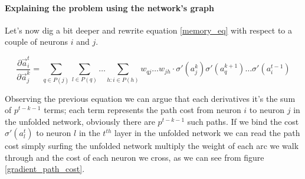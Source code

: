 \paragraph{Explaining the problem using the network's graph}
Let's now dig a bit deeper and rewrite equation \ref{memory_eq} with respect to a couple of neurons $i$ and $j$.

\begin{equation} 
\frac{\partial \vec{a}_i^t}{\partial \vec{a}_j^k} = \sum_{q\in P(j)} \sum_{l \in P(q)} \hdots \sum_{h : i \in P(h)} w_{qj} \hdots w_{jh} \cdot \sigma'(a_j^k)\sigma'(a_q^{k+1}) \hdots \sigma'(a_i^{t-1})
\label{expanded_mem}
\end{equation}


Observing the previous equation we can argue that each derivatives it's the sum of $p^{t-k-1}$ terms; each term represents the path cost from neuron $i$ to neuron $j$ in the unfolded network, obviously
there are $p^{t-k-1}$ such paths. If we bind the cost $\sigma'(a_l^t)$ to neuron $l$ in the $t^{th}$ layer in the unfolded network we can read the path cost simply surfing the unfolded network multiply
the weight of each arc we walk through and the cost of each neuron we cross, as we can see from figure \ref{gradient_path_cost}.



